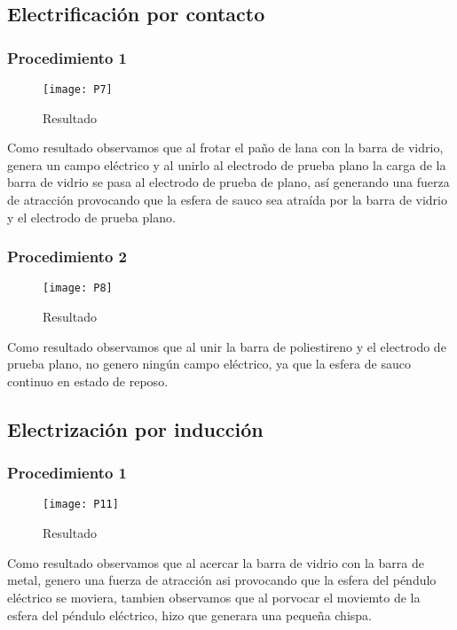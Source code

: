 \documentclass[spanish,10pt,a4paper,onecolumn]{article}
\begin{document}
\subsection{Electrificación por contacto}
\subsubsection{Procedimiento 1}

\begin{figure}[h!]
	\centering
	\texttt{[image: P7]}
	\caption{Resultado}
\end{figure}

Como resultado observamos que al frotar el paño de lana con la barra de vidrio, genera un campo eléctrico y al unirlo al electrodo de prueba plano la carga de la barra de vidrio se pasa al electrodo de prueba de plano, así generando una fuerza de atracción provocando que la esfera de sauco sea atraída por la barra de vidrio y el electrodo de prueba plano.

\subsubsection{Procedimiento 2}

\begin{figure}[h!]
	\centering
	\texttt{[image: P8]}
	\caption{Resultado}
\end{figure}

Como resultado observamos que al unir la barra de poliestireno y el electrodo de prueba plano, no genero ningún campo eléctrico, ya que la esfera de sauco  continuo en estado de reposo.                                                                    

\subsection{Electrización por inducción}

\subsubsection{Procedimiento 1}

\begin{figure}[h!]
	\centering
	\texttt{[image: P11]}
	\caption{Resultado}
\end{figure}

Como resultado observamos que al acercar la barra de vidrio con la barra de metal, genero una fuerza de atracción asi provocando que la esfera del péndulo eléctrico se moviera, tambien observamos que al porvocar el moviemto de la esfera del péndulo eléctrico, hizo que generara una pequeña chispa.
\end{document}
